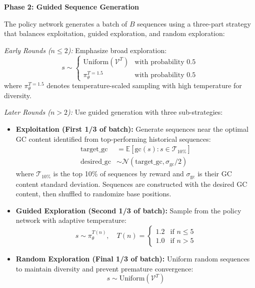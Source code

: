 \documentclass[conference]{IEEEtran}
\begin{document}
\textbf{Phase 2: Guided Sequence Generation}

The policy network generates a batch of $B$ sequences using a three-part strategy that balances exploitation, guided exploration, and random exploration:

\textit{Early Rounds ($n \leq 2$):} Emphasize broad exploration:
\begin{equation}
s \sim \begin{cases}
\text{Uniform}(\mathcal{V}^T) & \text{with probability } 0.5 \\
\pi_\theta^{T=1.5} & \text{with probability } 0.5
\end{cases}
\end{equation}
where $\pi_\theta^{T=1.5}$ denotes temperature-scaled sampling with high temperature for diversity.

\textit{Later Rounds ($n > 2$):} Use guided generation with three sub-strategies:
\begin{itemize}
    \item \textbf{Exploitation (First 1/3 of batch):} Generate sequences near the optimal GC content identified from top-performing historical sequences:
    \begin{align}
    \text{target\_gc} &= \mathbb{E}[\text{gc}(s) : s \in \mathcal{T}_{10\%}] \\
    \text{desired\_gc} &\sim \mathcal{N}(\text{target\_gc}, \sigma_{\text{gc}}/2)
    \end{align}
    where $\mathcal{T}_{10\%}$ is the top 10\% of sequences by reward and $\sigma_{\text{gc}}$ is their GC content standard deviation. Sequences are constructed with the desired GC content, then shuffled to randomize base positions.
    
    \item \textbf{Guided Exploration (Second 1/3 of batch):} Sample from the policy network with adaptive temperature:
    \begin{equation}
    s \sim \pi_\theta^{T(n)}, \quad T(n) = \begin{cases}
    1.2 & \text{if } n \leq 5 \\
    1.0 & \text{if } n > 5
    \end{cases}
    \end{equation}
    
    \item \textbf{Random Exploration (Final 1/3 of batch):} Uniform random sequences to maintain diversity and prevent premature convergence:
    \begin{equation}
    s \sim \text{Uniform}(\mathcal{V}^T)
    \end{equation}
\end{itemize}
\end{document}
